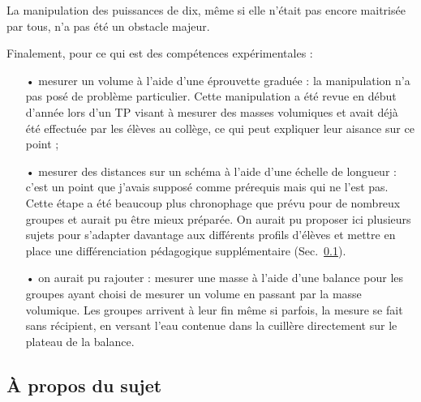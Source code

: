 \documentclass[12pt,a4paper, fleqn]{report}
\begin{document}
La manipulation des puissances de dix, même si elle n'était pas encore maitrisée par tous, n'a pas été un obstacle majeur.

Finalement, pour ce qui est des compétences expérimentales :
\begin{itemize}
\item[•] mesurer un volume à l'aide d'une éprouvette graduée : la manipulation n'a pas posé de problème particulier.
Cette manipulation a été revue en début d'année lors d'un TP visant à mesurer des masses volumiques et avait déjà été effectuée par les élèves au collège, ce qui peut expliquer leur aisance sur ce point ;
\item[•] mesurer des distances sur un schéma à l'aide d'une échelle de longueur : c'est un point que j'avais supposé comme prérequis mais qui ne l'est pas.
Cette étape a été beaucoup plus chronophage que prévu pour de nombreux groupes et aurait pu être mieux préparée.
On aurait pu proposer ici plusieurs sujets pour s'adapter davantage aux différents profils d'élèves et mettre en place une différenciation pédagogique supplémentaire (Sec.~\ref{sec:sujet}).
\item[•] on aurait pu rajouter : mesurer une masse à l'aide d'une balance pour les groupes ayant choisi de mesurer un volume en passant par la masse volumique.
Les groupes arrivent à leur fin même si parfois, la mesure se fait sans récipient, en versant l'eau contenue dans la cuillère directement sur le plateau de la balance.
\end{itemize}

\subsection{À propos du sujet}
\label{sec:sujet}
\end{document}
